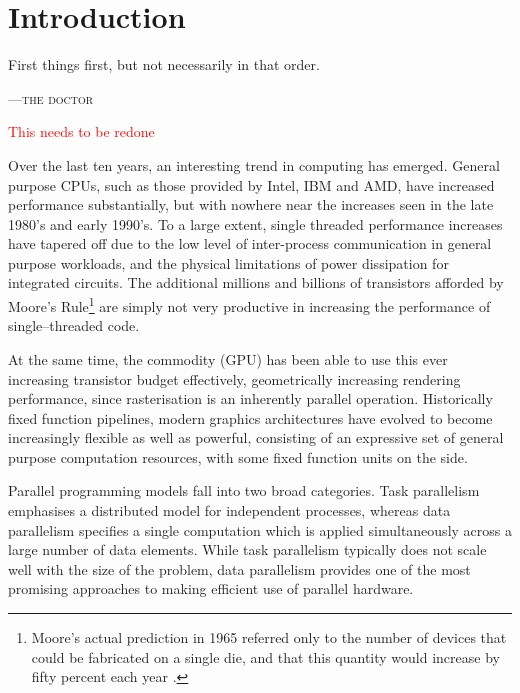
\chapter{Introduction}
\epigraph{First things first, but not necessarily in that order.}
{\textsc{---the doctor}}


\textcolor{red}{This needs to be redone}

Over the last ten years, an interesting trend in computing has emerged. General
purpose CPUs, such as those provided by Intel, IBM and AMD, have increased
performance substantially, but with nowhere near the increases seen in the late
1980's and early 1990's. To a large extent, single threaded performance
increases have tapered off due to the low level of inter-process communication
in general purpose workloads, and the physical limitations of power dissipation
for integrated circuits. The additional millions and billions of transistors
afforded by Moore's Rule\footnote{Moore's actual prediction in 1965 referred
only to the number of devices that could be fabricated on a single die, and that
this quantity would increase by fifty percent each year \cite{Moore:1965wc}.}
are simply not very productive in increasing the performance of single--threaded
code.

At the same time, the commodity  (GPU) has been
able to use this ever increasing transistor budget effectively, geometrically
increasing rendering performance, since rasterisation is an inherently parallel
operation. Historically fixed function pipelines, modern graphics architectures
have evolved to become increasingly flexible as well as powerful, consisting of
an expressive set of general purpose computation resources, with some fixed
function units on the side.

Parallel programming models fall into two broad categories. Task parallelism
emphasises a distributed model for independent processes, whereas data
parallelism specifies a single computation which is applied simultaneously
across a large number of data elements. While task parallelism typically does not
scale well with the size of the problem, data parallelism provides one of the
most promising approaches to making efficient use of parallel hardware.

